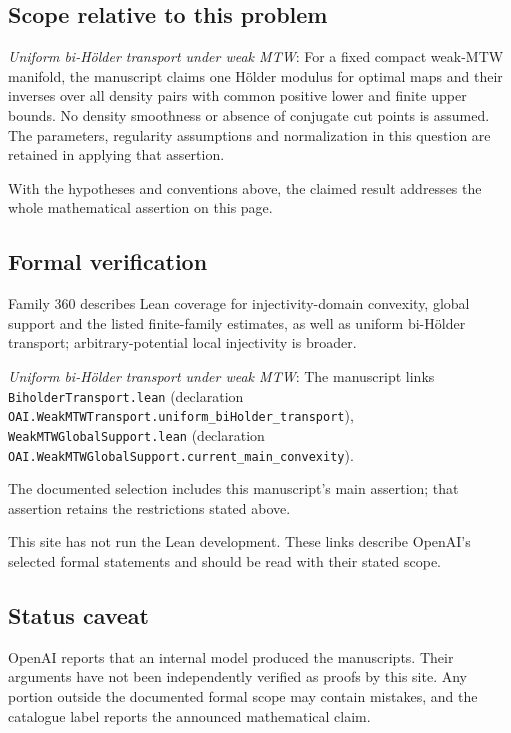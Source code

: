 \documentclass[11pt]{article}
\begin{document}
\subsection{Scope relative to this problem}
\textit{Uniform bi-Hölder transport under weak MTW}: For a fixed compact weak-MTW manifold, the manuscript claims one Hölder modulus for optimal maps and their inverses over all density pairs with common positive lower and finite upper bounds. No density smoothness or absence of conjugate cut points is assumed. The parameters, regularity assumptions and normalization in this question are retained in applying that assertion.

With the hypotheses and conventions above, the claimed result addresses the whole mathematical assertion on this page.

\subsection{Formal verification}
Family 360 describes Lean coverage for injectivity-domain convexity, global support and the listed finite-family estimates, as well as uniform bi-Hölder transport; arbitrary-potential local injectivity is broader.

\textit{Uniform bi-Hölder transport under weak MTW}: The manuscript links \texttt{BiholderTransport.lean} (declaration \texttt{OAI.WeakMTWTransport.uniform\_biHolder\_transport}), \texttt{WeakMTWGlobalSupport.lean} (declaration \texttt{OAI.WeakMTWGlobalSupport.current\_main\_convexity}).

The documented selection includes this manuscript’s main assertion; that assertion retains the restrictions stated above.

This site has not run the Lean development. These links describe OpenAI’s selected formal statements and should be read with their stated scope.

\subsection{Status caveat}
OpenAI reports that an internal model produced the manuscripts. Their arguments have not been independently verified as proofs by this site. Any portion outside the documented formal scope may contain mistakes, and the catalogue label reports the announced mathematical claim.
\end{document}
